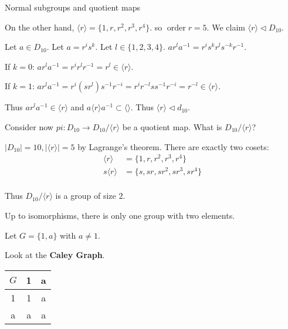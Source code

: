 \documentclass{article}
\DeclareMathOperator{\order}{order}
\newcommand{\abs}[1]{ \left| #1 \right|}
\begin{document}
\begin{cex}{Normal subgroups and quotient maps}{}
\begin{enumerate}
            On the other hand, $ \langle r \rangle = \{ 1, r, r^2, r^3, r^4 \}$. so $\order r = 5$. We claim $ \langle r \rangle \triangleleft D_{10}$. 
            \begin{cpf}
                Let $a \in D_{10}$. Let $a = r^is^k$. Let $l \in \{1, 2, 3, 4\}$. $ar^la^{-1} = r^is^kr^ls^{-k}r^{-1}$. 

                If $k=0$: $ar^{l}a^{-1} = r^ir^lr^{-1} = r^{l} \in \langle r \rangle$. 
                
                If $k = 1$: $ar^{l}a^{-1} = r^{i}(sr^l)s^{-1}r^{-i} = r^{i}r^{-l}ss^{-1}r^{-i} = r^{-l} \in \langle r \rangle$. 
                
                Thus $ar^la^{-1} \in \langle r \rangle$ and $a \langle r \rangle a^{-1} \subset \langle \rangle$. Thus $ \langle r \rangle \triangleleft d_{10}$. 
            \end{cpf}

            Consider now $pi: D_{10}\to D_{10}/ \langle r \rangle$ be a quotient map. What is $D_{10} / \langle r \rangle $?

            $\abs{D_{10}} = 10, \abs{ \langle r \rangle} = 5$ by Lagrange's theorem. There are exactly two cosets:
            \begin{align*}
                \langle r \rangle  & = \{ 1, r, r^2, r^3, r^4 \}\\
                s \langle r \rangle & = \{s, sr, sr^2, sr^3, sr^4 \}\\
            \end{align*}

            Thus $D_{10} / \langle r \rangle$ is a group of size $2$. 
            
            Up to isomorphisms, there is only one group with two elements. 
            \begin{cpf}
                Let $G =\{ 1, a \}$ with $a \neq 1$. 

                Look at the \textbf{Caley Graph}. 
                \begin{center}
                    \begin{tabular}{|c| |c| |c|}
                    $G$ & 1 & a \\
                    \hline
                    1 & 1 & a \\
                    \hline
                    a & a & a\\
                \end{tabular}
            \end{center}


\end{cpf}
\end{enumerate}
\end{cex}
\end{document}
